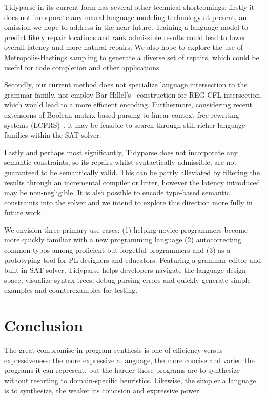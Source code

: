 \documentclass[sigplan,review,anonymous,acmsmall]{acmart}\settopmatter{printfolios=false,printccs=false,printacmref=false}
\begin{document}
Tidyparse in its current form has several other technical shortcomings: firstly it does not incorporate any neural language modeling technology at present, an omission we hope to address in the near future. Training a language model to predict likely repair locations and rank admissible results could lead to lower overall latency and more natural repairs. We also hope to explore the use of Metropolis-Hastings sampling to generate a diverse set of repairs, which could be useful for code completion and other applications.

Secondly, our current method does not specialize language intersection to the grammar family, nor employ Bar-Hillel's~\cite{bar1961formal} construction for REG-CFL intersection, which would lead to a more efficient encoding. Furthermore, considering recent extensions of Boolean matrix-based parsing to linear context-free rewriting systems (LCFRS)~\cite{cohen2016parsing}, it may be feasible to search through still richer language families within the SAT solver.

Lastly and perhaps most significantly, Tidyparse does not incorporate any semantic constraints, so its repairs whilst syntactically admissible, are not guaranteed to be semantically valid. This can be partly alleviated by filtering the results through an incremental compiler or linter, however the latency introduced may be non-negligible. It is also possible to encode type-based semantic constraints into the solver and we intend to explore this direction more fully in future work.

We envision three primary use cases: (1) helping novice programmers become more quickly familiar with a new programming language (2) autocorrecting common typos among proficient but forgetful programmers and (3) as a prototyping tool for PL designers and educators. Featuring a grammar editor and built-in SAT solver, Tidyparse helps developers navigate the language design space, visualize syntax trees, debug parsing errors and quickly generate simple examples and counterexamples for testing. %

\section{Conclusion}\label{sec:conclusion}

The great compromise in program synthesis is one of efficiency versus expressiveness: the more expressive a language, the more concise and varied the programs it can represent, but the harder those programs are to synthesize without resorting to domain-specific heuristics. Likewise, the simpler a language is to synthesize, the weaker its concision and expressive power.
\end{document}
